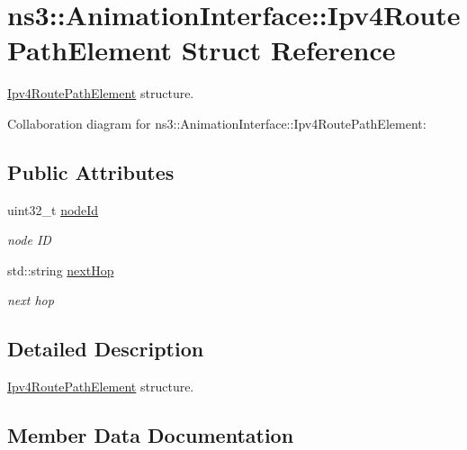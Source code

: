 \hypertarget{structns3_1_1AnimationInterface_1_1Ipv4RoutePathElement}{}\section{ns3\+:\+:Animation\+Interface\+:\+:Ipv4\+Route\+Path\+Element Struct Reference}
\label{structns3_1_1AnimationInterface_1_1Ipv4RoutePathElement}


\hyperlink{structns3_1_1AnimationInterface_1_1Ipv4RoutePathElement}{Ipv4\+Route\+Path\+Element} structure.  




Collaboration diagram for ns3\+:\+:Animation\+Interface\+:\+:Ipv4\+Route\+Path\+Element\+:
\subsection*{Public Attributes}
\begin{DoxyCompactItemize}
\item 
uint32\+\_\+t \hyperlink{structns3_1_1AnimationInterface_1_1Ipv4RoutePathElement_a1c729254285ae30ac49569f7705792c5}{node\+Id}
\begin{DoxyCompactList}\small\item\em node ID \end{DoxyCompactList}\item 
std\+::string \hyperlink{structns3_1_1AnimationInterface_1_1Ipv4RoutePathElement_a09b11d5ed0d9122d911c9c762c74e2fc}{next\+Hop}
\begin{DoxyCompactList}\small\item\em next hop \end{DoxyCompactList}\end{DoxyCompactItemize}


\subsection{Detailed Description}
\hyperlink{structns3_1_1AnimationInterface_1_1Ipv4RoutePathElement}{Ipv4\+Route\+Path\+Element} structure. 

\subsection{Member Data Documentation}
